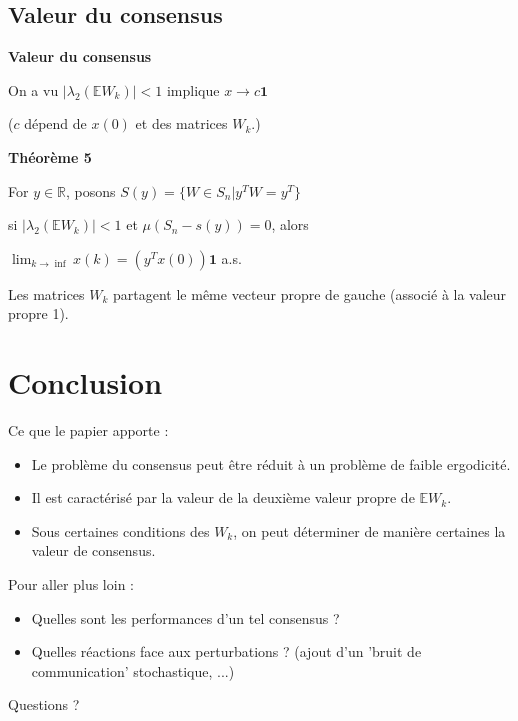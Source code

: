 \documentclass{beamer}
\begin{document}
\subsection{Valeur du consensus}
\begin{frame}
	\textbf{Valeur du consensus}

	On a vu $| \lambda_2(\mathbb{E}W_k)| < 1$ implique $x \to c\textbf{1}$

	($c$ dépend de $x(0)$ et des matrices $W_k$.)

	\bigbreak
	\pause
	\textbf{Théorème 5}

	For $y \in \mathbb{R}$, posons $S(y) = \{W \in S_n | y^TW = y^T\}$

	si $| \lambda_2(\mathbb{E}W_k)| < 1$ et $\mu (S_n - s(y)) = 0$, alors

	\begin{center}
		$\lim_{k \to \inf}x(k) = (y^Tx(0))\textbf{1}$ \quad a.s.		
	\end{center}
	\pause
	Les matrices $W_k$ partagent le même vecteur propre de gauche
	(associé à la valeur propre 1).
\end{frame}


\section*{Conclusion}
\begin{frame}
	Ce que le papier apporte :
	\begin{itemize}
		\item Le problème du consensus peut être réduit à un problème de faible ergodicité.
		\pause
		\item Il est caractérisé par la valeur de la deuxième valeur propre de $\mathbb{E}W_k$.
		\pause
		\item Sous certaines conditions des $W_k$, on peut déterminer de manière certaines la valeur de consensus.
	\end{itemize}
	\pause
	Pour aller plus loin :
	\begin{itemize}
		\item Quelles sont les performances d'un tel consensus ?
		\pause
		\item Quelles réactions face aux perturbations ? (ajout d'un 'bruit de communication' stochastique, ...)
	\end{itemize}
\end{frame}

\begin{frame}
	\begin{center}
		\LARGE Questions ?
	\end{center}
\end{frame}
\end{document}
